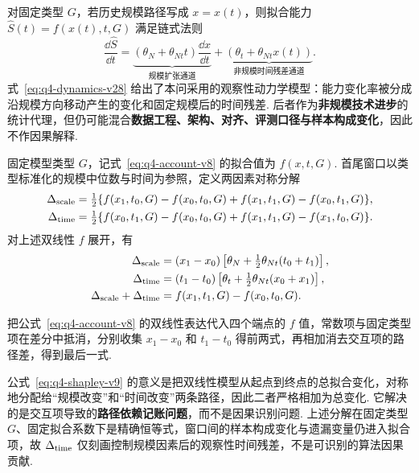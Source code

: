 \setcounter{obsitem}{0}
对固定类型 $G$，若历史规模路径写成 $x=x(t)$，则拟合能力 $\widehat S(t)=f(x(t),t,G)$ 满足链式法则
\begin{equation}\label{eq:q4-dynamics-v28}
\frac{\dd\widehat S}{\dd t}
=
\underbrace{\left(\theta_N+\theta_{Nt}t\right)\frac{\dd x}{\dd t}}_{\text{规模扩张通道}}
+
\underbrace{\left(\theta_t+\theta_{Nt}x(t)\right)}_{\text{非规模时间残差通道}}.
\end{equation}
式~\eqref{eq:q4-dynamics-v28} 给出了本问采用的观察性动力学模型：能力变化率被分成沿规模方向移动产生的变化和固定规模后的时间残差. 后者作为\textbf{非规模技术进步}的统计代理，但仍可能混合\textbf{数据工程、架构、对齐、评测口径与样本构成变化}，因此不作因果解释.

固定模型类型 $G$，记式~\eqref{eq:q4-account-v8} 的拟合值为 $f(x,t,G)$. 首尾窗口以类型标准化的规模中位数与时间为参照，定义两因素对称分解
\begin{subequations}
    \begin{align}
\Delta_{\rm scale}&=\tfrac12\{f(x_1,t_0,G)-f(x_0,t_0,G)+f(x_1,t_1,G)-f(x_0,t_1,G)\},\\
\Delta_{\rm time}&=\tfrac12\{f(x_0,t_1,G)-f(x_0,t_0,G)+f(x_1,t_1,G)-f(x_1,t_0,G)\}.
\end{align}
\end{subequations}
对上述双线性 $f$ 展开，有
\begin{subequations}\label{eq:q4-shapley-v9}
    \begin{align}
\Delta_{\rm scale}&=(x_1-x_0)\left[\theta_N+\tfrac12\theta_{Nt}(t_0+t_1)\right],\\
\Delta_{\rm time}&=(t_1-t_0)\left[\theta_t+\tfrac12\theta_{Nt}(x_0+x_1)\right],\\
\Delta_{\rm scale}+\Delta_{\rm time}&=f(x_1,t_1,G)-f(x_0,t_0,G).
\end{align}
\end{subequations}


把公式~\eqref{eq:q4-account-v8} 的双线性表达代入四个端点的 $f$ 值，常数项与固定类型项在差分中抵消，分别收集 $x_1-x_0$ 和 $t_1-t_0$ 得前两式，再相加消去交互项的路径差，得到最后一式. 
\par
公式~\eqref{eq:q4-shapley-v9} 的意义是把双线性模型从起点到终点的总拟合变化，对称地分配给“规模改变”和“时间改变”两条路径，因此二者严格相加为总变化. 它解决的是交互项导致的\textbf{路径依赖记账问题}，而不是因果识别问题. 上述分解在固定类型 $G$、固定拟合系数下是精确恒等式，窗口间的样本构成变化与遗漏变量仍进入拟合项，故 $\Delta_{\rm time}$ 仅刻画控制规模因素后的观察性时间残差，不是可识别的算法因果贡献. 

